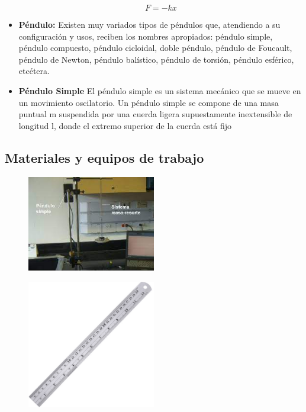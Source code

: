\begin{itemize}
\begin{equation*}
		      F = -kx
	      \end{equation*}
	\item \textbf{Péndulo:}
	      Existen muy variados tipos de péndulos que, atendiendo a su configuración y usos,
	      reciben los nombres apropiados: péndulo simple, péndulo compuesto, péndulo cicloidal,
	      doble péndulo, péndulo de Foucault, péndulo de Newton, péndulo balístico, péndulo de
	      torsión, péndulo esférico, etcétera.
	\item \textbf{Péndulo Simple}
	      El péndulo simple es un sistema mecánico que se mueve en un movimiento oscilatorio.
	      Un péndulo simple se compone de una masa puntual m suspendida por una cuerda
	      ligera supuestamente inextensible de longitud l, donde el extremo superior de la cuerda
	      está fijo
\end{itemize}
\subsection{Materiales y  equipos de trabajo}
\begin{figure}[H]
	\begin{center}
		\includegraphics[width = 0.5\textwidth]{Imagenes/pen.jpg}
	\end{center}
\end{figure}

\begin{figure}[H]
	\begin{center}
		\includegraphics[width = 0.5\textwidth]{Imagenes/regla.jpg}
	\end{center}
\end{figure}

